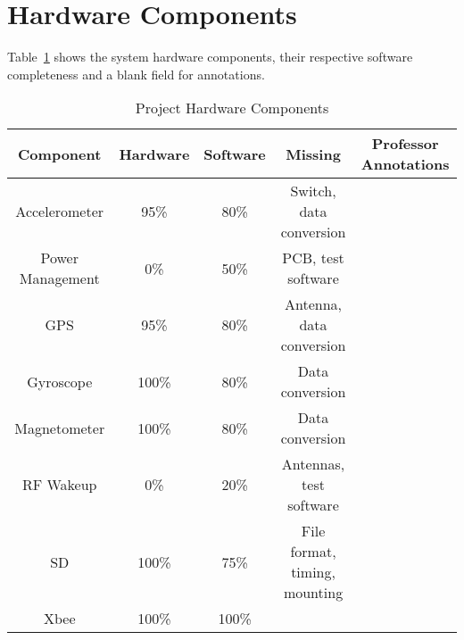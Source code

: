 \section{Hardware Components}
Table~\ref{tab:hwComp} shows the system hardware components, their respective software completeness and a blank field for annotations.


    \begin{table}[H]
    \centering
    \caption{Project Hardware Components}
    \begin{tabular}{|c|c|c|c|c|}
    \hline
    \rowcolor{Gray}
    Component & Hardware & Software & Missing & Professor Annotations \\ 
    \hline \hline   
        Accelerometer & 95\% & 80\% & Switch, data conversion  & \\ \hline
        Power Management & 0\% & 50\%  & PCB, test software & \\ \hline
        GPS   & 95\% & 80\%   & Antenna, data conversion & \\ \hline
        Gyroscope & 100\%   & 80\% & Data conversion & \\ \hline
        Magnetometer & 100\%   & 80\%  & Data conversion & \\ \hline
        RF Wakeup & 0\% & 20\%  & Antennas, test software & \\ \hline
        SD & 100\%  & 75\% & File format, timing, mounting& \\ \hline
        Xbee  & 100\% & 100\%  & & \\ \hline
        \end{tabular}%
    \label{tab:hwComp}%
    \end{table}

